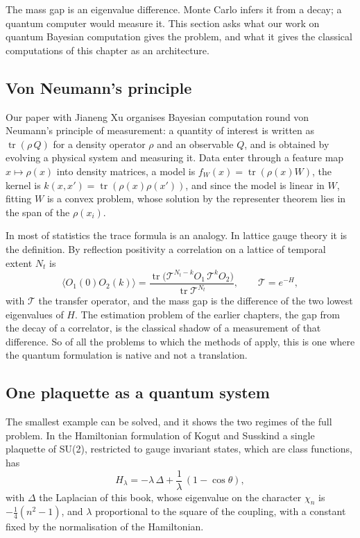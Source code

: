 The mass gap is an eigenvalue difference. Monte Carlo infers it from a decay; a quantum computer would measure it. This section asks what our work on quantum Bayesian computation gives the problem, and what it gives the classical computations of this chapter as an architecture.

\subsection{Von Neumann's principle}

Our paper with Jianeng Xu \cite{PSX23} organises Bayesian computation round von Neumann's principle of measurement: a quantity of interest is written as $\operatorname{tr}(\rho\,Q)$ for a density operator $\rho$ and an observable $Q$, and is obtained by evolving a physical system and measuring it. Data enter through a feature map $x\mapsto\rho(x)$ into density matrices, a model is $f_W(x)=\operatorname{tr}(\rho(x)W)$, the kernel is $k(x,x')=\operatorname{tr}(\rho(x)\rho(x'))$, and since the model is linear in $W$, fitting $W$ is a convex problem, whose solution by the representer theorem lies in the span of the $\rho(x_i)$.

In most of statistics the trace formula is an analogy. In lattice gauge theory it is the definition. By reflection positivity a correlation on a lattice of temporal extent $N_t$ is
\[
\langle O_1(0)O_2(k)\rangle=\frac{\operatorname{tr}\big(\mathcal T^{N_t-k}O_1\,\mathcal T^kO_2\big)}{\operatorname{tr}\mathcal T^{N_t}},\qquad \mathcal T=e^{-H},
\]
with $\mathcal T$ the transfer operator, and the mass gap is the difference of the two lowest eigenvalues of $H$. The estimation problem of the earlier chapters, the gap from the decay of a correlator, is the classical shadow of a measurement of that difference. So of all the problems to which the methods of \cite{PSX23} apply, this is one where the quantum formulation is native and not a translation.

\subsection{One plaquette as a quantum system}\label{sec:oneplaquette}

The smallest example can be solved, and it shows the two regimes of the full problem. In the Hamiltonian formulation of Kogut and Susskind \cite{KS75} a single plaquette of SU(2), restricted to gauge invariant states, which are class functions, has
\[
H_\lambda=-\lambda\,\Delta+\frac1\lambda\,(1-\cos\theta),
\]
with $\Delta$ the Laplacian of this book, whose eigenvalue on the character $\chi_n$ is $-\frac14(n^2-1)$, and $\lambda$ proportional to the square of the coupling, with a constant fixed by the normalisation of the Hamiltonian.

